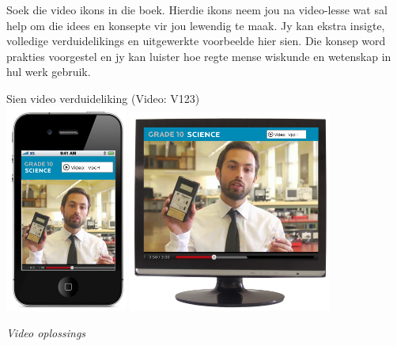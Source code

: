 {\normalsize

Soek die video ikons in die boek. Hierdie ikons neem jou na video-lesse wat sal help om die idees en konsepte vir jou lewendig te maak. Jy kan ekstra insigte, volledige verduidelikings en uitgewerkte voorbeelde hier sien. Die konsep word prakties voorgestel en jy kan luister hoe regte mense wiskunde en wetenskap in hul werk gebruik. 
\begin{center}
Sien video verduideliking  (Video: V123)\\

\includegraphics[width=0.3\textwidth]{title_images/Iphonevideo.png}
\hspace{1cm}
\includegraphics[width=0.5\textwidth]{title_images/PCscreenvideo.png}
\end{center}\par
}
\vspace{0.5cm}
{\normalfont\sffamily\fontsize{22}\normalfont\itshape Video oplossings} \par

